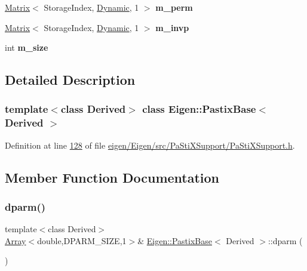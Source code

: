 \begin{DoxyCompactItemize}
\hyperlink{group___core___module_class_eigen_1_1_matrix}{Matrix}$<$ Storage\+Index, \hyperlink{namespace_eigen_ad81fa7195215a0ce30017dfac309f0b2}{Dynamic}, 1 $>$ {\bfseries m\+\_\+perm}
\item 
\mbox{\label{class_eigen_1_1_pastix_base_a94472e77232a18994caf5ae4b30b50c9}} 
\hyperlink{group___core___module_class_eigen_1_1_matrix}{Matrix}$<$ Storage\+Index, \hyperlink{namespace_eigen_ad81fa7195215a0ce30017dfac309f0b2}{Dynamic}, 1 $>$ {\bfseries m\+\_\+invp}
\item 
\mbox{\label{class_eigen_1_1_pastix_base_ab687f32875f2ff3e723d5b19584d533e}} 
int {\bfseries m\+\_\+size}
\end{DoxyCompactItemize}


\subsection{Detailed Description}
\subsubsection*{template$<$class Derived$>$\newline
class Eigen\+::\+Pastix\+Base$<$ Derived $>$}



Definition at line \hyperlink{eigen_2_eigen_2src_2_pa_sti_x_support_2_pa_sti_x_support_8h_source_l00128}{128} of file \hyperlink{eigen_2_eigen_2src_2_pa_sti_x_support_2_pa_sti_x_support_8h_source}{eigen/\+Eigen/src/\+Pa\+Sti\+X\+Support/\+Pa\+Sti\+X\+Support.\+h}.



\subsection{Member Function Documentation}
\mbox{\label{class_eigen_1_1_pastix_base_af4a29373aa3e6a980738efde33f92a76}} 
\subsubsection{\texorpdfstring{dparm()}{dparm()}\hspace{0.1cm}{\footnotesize\ttfamily [1/4]}}
{\footnotesize\ttfamily template$<$class Derived$>$ \\
\hyperlink{group___core___module_class_eigen_1_1_array}{Array}$<$double,D\+P\+A\+R\+M\+\_\+\+S\+I\+ZE,1$>$\& \hyperlink{class_eigen_1_1_pastix_base}{Eigen\+::\+Pastix\+Base}$<$ Derived $>$\+::dparm (\begin{DoxyParamCaption}{ }\end{DoxyParamCaption})\hspace{0.3cm}{\ttfamily [inline]}}

